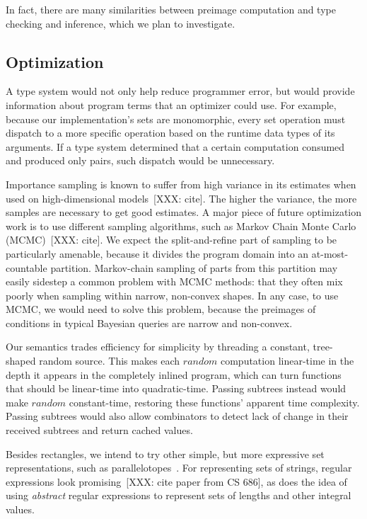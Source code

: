 In fact, there are many similarities between preimage computation and type checking and inference, which we plan to investigate.

\subsection{Optimization}

A type system would not only help reduce programmer error, but would provide information about program terms that an optimizer could use.
For example, because our implementation's sets are monomorphic, every set operation must dispatch to a more specific operation based on the runtime data types of its arguments.
If a type system determined that a certain computation consumed and produced only pairs, such dispatch would be unnecessary.

Importance sampling is known to suffer from high variance in its estimates when used on high-dimensional models~[XXX: cite].
The higher the variance, the more samples are necessary to get good estimates.
A major piece of future optimization work is to use different sampling algorithms, such as Markov Chain Monte Carlo (MCMC)~[XXX: cite].
We expect the split-and-refine part of sampling to be particularly amenable, because it divides the program domain into an at-most-countable partition.
Markov-chain sampling of parts from this partition may easily sidestep a common problem with MCMC methods: that they often mix poorly when sampling within narrow, non-convex shapes.
In any case, to use MCMC, we would need to solve this problem, because the preimages of conditions in typical Bayesian queries are narrow and non-convex.

Our semantics trades efficiency for simplicity by threading a constant, tree-shaped random source.
This makes each $random$ computation linear-time in the depth it appears in the completely inlined program, which can turn functions that should be linear-time into quadratic-time.
Passing subtrees instead would make $random$ constant-time, restoring these functions' apparent time complexity.
Passing subtrees would also allow combinators to detect lack of change in their received subtrees and return cached values.

Besides rectangles, we intend to try other simple, but more expressive set representations, such as parallelotopes~\cite{cit:amato-2012tcs-parallelotopes}.
For representing sets of strings, regular expressions look promising~[XXX: cite paper from CS 686], as does the idea of using \emph{abstract} regular expressions to represent sets of lengths and other integral values.

